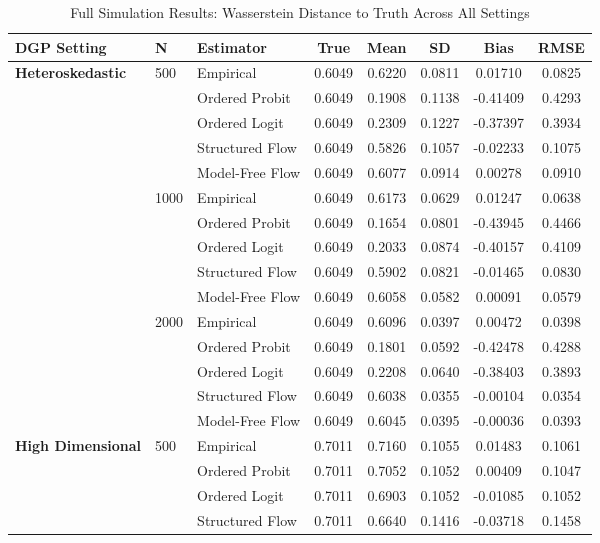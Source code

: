 \documentclass{article}
\numberwithin{figure}{section}
\numberwithin{table}{section}
\numberwithin{equation}{section}
\begin{document}
\begin{table}[ht]
\centering
\small
\caption{Full Simulation Results: Wasserstein Distance to Truth Across All Settings}
\label{tab:app_full_wasserstein}
\begin{tabular}{lllccccc}
\toprule
\textbf{DGP Setting} & \textbf{N} & \textbf{Estimator} & \textbf{True} & \textbf{Mean} & \textbf{SD} & \textbf{Bias} & \textbf{RMSE} \\
\midrule
\textbf{Heteroskedastic} & 500 & Empirical & 0.6049 & 0.6220 & 0.0811 & 0.01710 & 0.0825 \\
 &  & Ordered Probit & 0.6049 & 0.1908 & 0.1138 & -0.41409 & 0.4293 \\
 &  & Ordered Logit & 0.6049 & 0.2309 & 0.1227 & -0.37397 & 0.3934 \\
 &  & Structured Flow & 0.6049 & 0.5826 & 0.1057 & -0.02233 & 0.1075 \\
 &  & Model-Free Flow & 0.6049 & 0.6077 & 0.0914 & 0.00278 & 0.0910 \\
\cline{2-8}
 & 1000 & Empirical & 0.6049 & 0.6173 & 0.0629 & 0.01247 & 0.0638 \\
 &  & Ordered Probit & 0.6049 & 0.1654 & 0.0801 & -0.43945 & 0.4466 \\
 &  & Ordered Logit & 0.6049 & 0.2033 & 0.0874 & -0.40157 & 0.4109 \\
 &  & Structured Flow & 0.6049 & 0.5902 & 0.0821 & -0.01465 & 0.0830 \\
 &  & Model-Free Flow & 0.6049 & 0.6058 & 0.0582 & 0.00091 & 0.0579 \\
\cline{2-8}
 & 2000 & Empirical & 0.6049 & 0.6096 & 0.0397 & 0.00472 & 0.0398 \\
 &  & Ordered Probit & 0.6049 & 0.1801 & 0.0592 & -0.42478 & 0.4288 \\
 &  & Ordered Logit & 0.6049 & 0.2208 & 0.0640 & -0.38403 & 0.3893 \\
 &  & Structured Flow & 0.6049 & 0.6038 & 0.0355 & -0.00104 & 0.0354 \\
 &  & Model-Free Flow & 0.6049 & 0.6045 & 0.0395 & -0.00036 & 0.0393 \\
\midrule
\textbf{High Dimensional} & 500 & Empirical & 0.7011 & 0.7160 & 0.1055 & 0.01483 & 0.1061 \\
 &  & Ordered Probit & 0.7011 & 0.7052 & 0.1052 & 0.00409 & 0.1047 \\
 &  & Ordered Logit & 0.7011 & 0.6903 & 0.1052 & -0.01085 & 0.1052 \\
 &  & Structured Flow & 0.7011 & 0.6640 & 0.1416 & -0.03718 & 0.1458 \\

\end{tabular}
\end{table}
\end{document}
